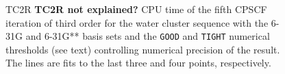 \documentclass[prl,aps,twocolumn,showpacs,twocolumngrid,superbib]{revtex4}
\begin{document}
\begin{figure}[t]
  \caption{\protect
    TC2R {\bf TC2R not explained?} CPU time of the fifth CPSCF iteration of third order for
    the water cluster sequence with the 6-31G and 6-31G** 
    basis sets and the {\tt GOOD} and {\tt TIGHT} 
    numerical thresholds (see text) controlling numerical
    precision of the result. The lines are fits to the 
    last three and four points, respectively.
  }\label{fig:Gamma_TC2R_Timing}
\end{figure}
\end{document}
